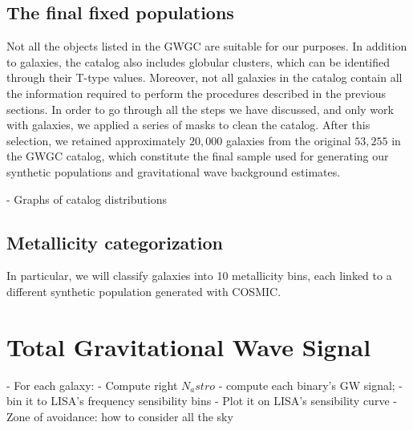 \subsection{The final fixed populations}
Not all the objects listed in the GWGC are suitable for our purposes.
In addition to galaxies, the catalog also includes globular clusters, which can be identified through their T-type values. 
Moreover, not all galaxies in the catalog contain all the information required to perform the procedures described in the previous sections.
In order to go through all the steps we have discussed, and only work with galaxies, we applied a series of masks to clean the catalog.
After this selection, we retained approximately $20,000$ galaxies from the original $53,255$ in the GWGC catalog, which constitute the final sample used for generating our synthetic populations and gravitational wave background estimates.

    - Graphs of catalog distributions

\subsection{Metallicity categorization}

In particular, we will classify galaxies into 10 metallicity bins, each linked to a different synthetic population generated with COSMIC.


\section{Total Gravitational Wave Signal}
- For each galaxy:
    - Compute right $N_astro$
    - compute each binary's GW signal;
    - bin it to LISA's frequency sensibility bins
    - Plot it on LISA's sensibility curve
- Zone of avoidance: how to consider all the sky


